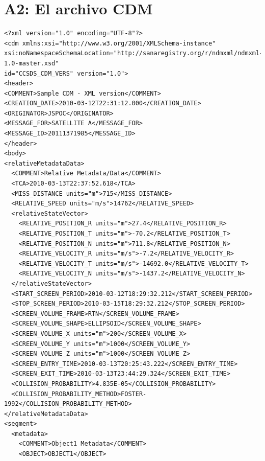 
\newpage
\section{A2: El archivo CDM}
\label{App2}

\lstset{language=XML,basicstyle=\small}
\begin{lstlisting}
<?xml version="1.0" encoding="UTF-8"?>
<cdm xmlns:xsi="http://www.w3.org/2001/XMLSchema-instance"
xsi:noNamespaceSchemaLocation="http://sanaregistry.org/r/ndmxml/ndmxml-1.0-master.xsd"
id="CCSDS_CDM_VERS" version="1.0">
<header>
<COMMENT>Sample CDM - XML version</COMMENT>
<CREATION_DATE>2010-03-12T22:31:12.000</CREATION_DATE>
<ORIGINATOR>JSPOC</ORIGINATOR>
<MESSAGE_FOR>SATELLITE A</MESSAGE_FOR>
<MESSAGE_ID>20111371985</MESSAGE_ID>
</header>
<body>
<relativeMetadataData>
  <COMMENT>Relative Metadata/Data</COMMENT>
  <TCA>2010-03-13T22:37:52.618</TCA>
  <MISS_DISTANCE units="m">715</MISS_DISTANCE>
  <RELATIVE_SPEED units="m/s">14762</RELATIVE_SPEED>
  <relativeStateVector>
    <RELATIVE_POSITION_R units="m">27.4</RELATIVE_POSITION_R>
    <RELATIVE_POSITION_T units="m">-70.2</RELATIVE_POSITION_T>
    <RELATIVE_POSITION_N units="m">711.8</RELATIVE_POSITION_N>
    <RELATIVE_VELOCITY_R units="m/s">-7.2</RELATIVE_VELOCITY_R>
    <RELATIVE_VELOCITY_T units="m/s">-14692.0</RELATIVE_VELOCITY_T>
    <RELATIVE_VELOCITY_N units="m/s">-1437.2</RELATIVE_VELOCITY_N>
  </relativeStateVector>
  <START_SCREEN_PERIOD>2010-03-12T18:29:32.212</START_SCREEN_PERIOD>
  <STOP_SCREEN_PERIOD>2010-03-15T18:29:32.212</STOP_SCREEN_PERIOD>
  <SCREEN_VOLUME_FRAME>RTN</SCREEN_VOLUME_FRAME>
  <SCREEN_VOLUME_SHAPE>ELLIPSOID</SCREEN_VOLUME_SHAPE>
  <SCREEN_VOLUME_X units="m">200</SCREEN_VOLUME_X>
  <SCREEN_VOLUME_Y units="m">1000</SCREEN_VOLUME_Y>
  <SCREEN_VOLUME_Z units="m">1000</SCREEN_VOLUME_Z>
  <SCREEN_ENTRY_TIME>2010-03-13T20:25:43.222</SCREEN_ENTRY_TIME>
  <SCREEN_EXIT_TIME>2010-03-13T23:44:29.324</SCREEN_EXIT_TIME>
  <COLLISION_PROBABILITY>4.835E-05</COLLISION_PROBABILITY>
  <COLLISION_PROBABILITY_METHOD>FOSTER-1992</COLLISION_PROBABILITY_METHOD>
</relativeMetadataData>
<segment>
  <metadata>
    <COMMENT>Object1 Metadata</COMMENT>
    <OBJECT>OBJECT1</OBJECT>

\end{lstlisting}
